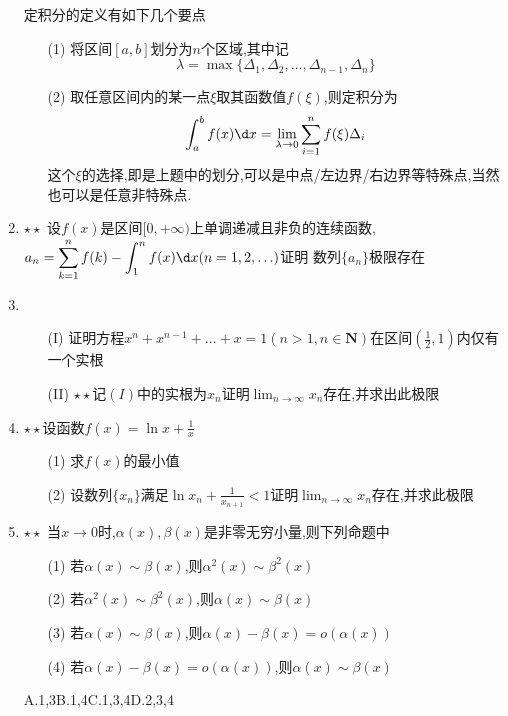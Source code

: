 \documentclass[12pt, a4paper, oneside, UTF8]{ctexbook}
\begin{document}
\begin{enumerate}
{        \newpage
        \begin{remark}[定积分的定义]
            定积分的定义有如下几个要点
            \begin{enumerate}
                \item [(1)] 将区间$[a,b]$划分为$n$个区域,其中记
                $$
                \lambda = \max\{\Delta_1,\Delta_2,\ldots,\Delta_{n-1},\Delta_{n}\}
                $$
                \item [(2)] 取任意区间内的某一点$\xi$取其函数值$f(\xi)$,则定积分为
                $$
                \int_{a}^{b}f(x)\d x = \lim_{\lambda\to 0}\sum_{i=1}^{n}f(\xi)\Delta_{i} 
                $$
                这个$\xi$的选择,即是上题中的划分,可以是中点/左边界/右边界等特殊点,当然也可以是任意非特殊点.
            \end{enumerate}
        \end{remark}
    }
    \item $\star\star$ 设$f(x)$是区间$[0,+\infty)$上单调递减且非负的连续函数,$\displaystyle a_n=\sum_{k=1}^{n}f(k)-\int_{1}^{n}f(x)\d x(n=1,2,\ldots)$证明
    数列$\{a_n\}$极限存在 

    \answer{
        \begin{solution}
            
        \end{solution}
    }
    \item 
    \begin{enumerate}
        \item [(I)] 证明方程$x^{n}+x^{n-1}+\ldots+x=1(n>1,n\in\mathbf{N})$在区间$\left(\frac{1}{2},1\right)$内仅有一个实根 
        \item [(II)] $\star\star$记$(I)$中的实根为$x_n$证明$\displaystyle \lim_{n\to\infty}x_n$存在,并求出此极限 
    \end{enumerate}

    \item $\star\star$设函数$f(x)=\ln{x}+\frac{1}{x}$ 
    \begin{enumerate}
        \item [(1)] 求$f(x)$的最小值 
        \item [(2)] 设数列$\{x_n\}$满足$\ln{x_n}+\frac{1}{x_{n+1}}<1$证明$\displaystyle\lim_{n\to\infty}x_n$存在,并求此极限
    \end{enumerate}

    \item $\star\star$ 当$x\to 0$时,$\alpha(x),\beta(x)$是非零无穷小量,则下列命题中 
    \begin{enumerate}
        \item [(1)] 若$\alpha(x)\sim\beta(x)$,则$\alpha^2(x)\sim\beta^2(x)$ 
        \item [(2)] 若$\alpha^2(x)\sim\beta^2(x)$,则$\alpha(x)\sim\beta(x)$
        \item [(3)] 若$\alpha(x)\sim\beta(x)$,则$\alpha(x)-\beta(x)=o(\alpha(x))$
        \item [(4)] 若$\alpha(x)-\beta(x)=o(\alpha(x))$,则$\alpha(x)\sim\beta(x)$
    \end{enumerate}
    A.1,3\qquad B.1,4\qquad C.1,3,4\qquad D.2,3,4 


\end{enumerate}
\end{document}
